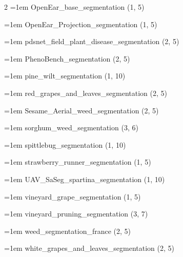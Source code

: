 \begin{multicols}{2}
\hangindent=1em OpenEar\_\allowbreak{}base\_\allowbreak{}segmentation (1, 5)\par
\hangindent=1em OpenEar\_\allowbreak{}Projection\_\allowbreak{}segmentation (1, 5)\par
\hangindent=1em pdsnet\_\allowbreak{}field\_\allowbreak{}plant\_\allowbreak{}disease\_\allowbreak{}segmentation (2, 5)\par
\hangindent=1em PhenoBench\_\allowbreak{}segmentation (2, 5)\par
\hangindent=1em pine\_\allowbreak{}wilt\_\allowbreak{}segmentation (1, 10)\par
\hangindent=1em red\_\allowbreak{}grapes\_\allowbreak{}and\_\allowbreak{}leaves\_\allowbreak{}segmentation (2, 5)\par
\hangindent=1em Sesame\_\allowbreak{}Aerial\_\allowbreak{}weed\_\allowbreak{}segmentation (2, 5)\par
\hangindent=1em sorghum\_\allowbreak{}weed\_\allowbreak{}segmentation (3, 6)\par
\hangindent=1em spittlebug\_\allowbreak{}segmentation (1, 10)\par
\hangindent=1em strawberry\_\allowbreak{}runner\_\allowbreak{}segmentation (1, 5)\par
\hangindent=1em UAV\_\allowbreak{}SaSeg\_\allowbreak{}spartina\_\allowbreak{}segmentation (1, 10)\par
\hangindent=1em vineyard\_\allowbreak{}grape\_\allowbreak{}segmentation (1, 5)\par
\hangindent=1em vineyard\_\allowbreak{}pruning\_\allowbreak{}segmentation (3, 7)\par
\hangindent=1em weed\_\allowbreak{}segmentation\_\allowbreak{}france (2, 5)\par
\hangindent=1em white\_\allowbreak{}grapes\_\allowbreak{}and\_\allowbreak{}leaves\_\allowbreak{}segmentation (2, 5)\par
\end{multicols}

